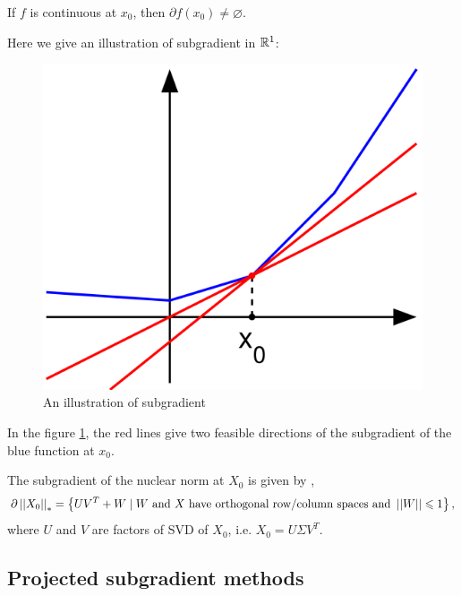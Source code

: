 \documentclass[11pt]{article}
\begin{document}
\begin{remark}
    If \(f\) is continuous at \(x_0\), then \(\partial f(x_0) \neq \varnothing\).
\end{remark}

Here we give an illustration of subgradient in \(\mathbb R^1\):
\begin{figure}[H]
    \centering
    \includegraphics[scale=0.3]{img/Subderivative_illustration.png}
    \setlength{\abovecaptionskip}{0cm}
    \caption{An illustration of subgradient}
    \label{fig:subgradient}
\end{figure}

In the figure \ref{fig:subgradient}, the red lines give two feasible directions of the subgradient of the blue function at \(x_0\).

\begin{proposition}
    The subgradient of the nuclear norm at \(X_0\) is given by \cite{lewis2003mathematics},\cite{watson1992characterization}
    \[\partial \left|\left|X_0\right|\right|_* = \left\{UV^T+W \mid W \textnormal{ and } X\textnormal{ have orthogonal row/column spaces and } \left|\left|W\right|\right| \leqslant 1 \right\},\]
    where \(U\) and \(V\) are factors of SVD of \(X_0\), i.e. \(X_0=U\Sigma V^T.\)
\end{proposition}


\subsection{Projected subgradient methods}
\end{document}
